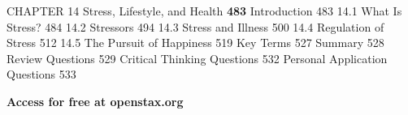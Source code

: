 \documentclass[11pt]{article}
\begin{document}
CHAPTER 14  Stress, Lifestyle, and Health \textbf{483 } Introduction  483  14.1 What Is Stress?  484  14.2 Stressors  494  14.3 Stress and Illness  500  14.4 Regulation of Stress  512  14.5 The Pursuit of Happiness  519  Key Terms  527  Summary  528  Review Questions  529  Critical Thinking Questions  532  Personal Application Questions  533

\textbf{Access for free at openstax.org}
\end{document}
